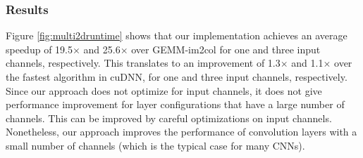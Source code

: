 \subsubsection{Results} Figure \ref{fig:multi2druntime} shows that our
implementation achieves an average speedup of 19.5$\times$ and 25.6$\times$ over GEMM-im2col for one and three input channels,
respectively. This translates to an improvement of 1.3$\times$ and 1.1$\times$ over the fastest algorithm in cuDNN, for one and three
input channels, respectively. Since our approach does not optimize for input channels, it does not give performance improvement for layer
configurations that have a large number of channels. This can be improved by careful optimizations on input channels. Nonetheless, our approach improves the performance of convolution layers with a small number of channels (which is the
typical case for many CNNs).
